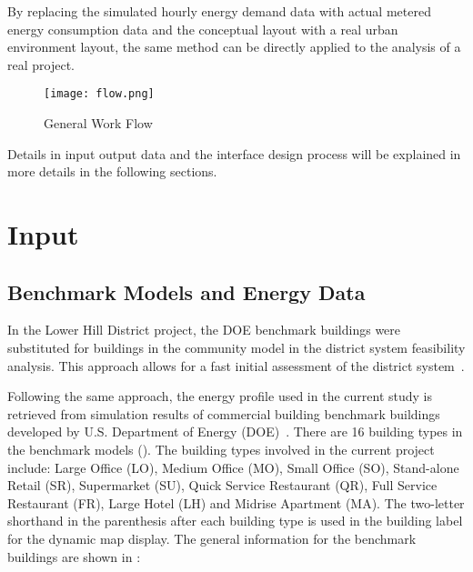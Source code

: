 By replacing the simulated hourly energy demand data with actual
metered energy consumption data and the conceptual layout with a real
urban environment layout, the same method can be directly applied to
the analysis of a real project.

\begin{figure}[h!]
  \centering
  \texttt{[image: flow.png]}
  \caption[General Work Flow]{General Work Flow}
  \label{fig:flow}
\end{figure}

Details in input output data and the interface design process will be
explained in more details in the following sections.
\newpage
\section{Input}
\subsection{Benchmark Models and Energy Data}
In the Lower Hill District project, the DOE benchmark buildings were
substituted for buildings in the community model in the district
system feasibility analysis. This approach allows for a fast initial
assessment of the district system~\cite{baird2014}.

Following the same approach, the energy profile used in the current
study is retrieved from simulation results of commercial building
benchmark buildings developed by U.S. Department of Energy
(DOE)~\cite{DOE2015}. There are 16 building types in the benchmark
models (). The building types involved in the
current project include: Large Office (LO), Medium Office (MO), Small
Office (SO), Stand-alone Retail (SR), Supermarket (SU), Quick Service
Restaurant (QR), Full Service Restaurant (FR), Large Hotel (LH) and
Midrise Apartment (MA). The two-letter shorthand in the parenthesis
after each building type is used in the building label for the dynamic
map display. The general information for the benchmark buildings are
shown in :

